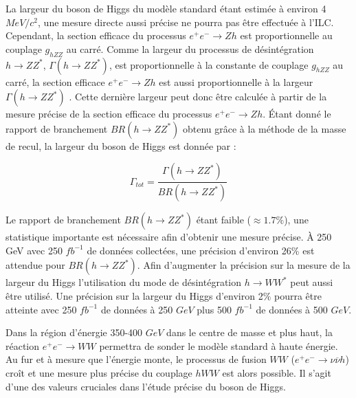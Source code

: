    \medskip
   
   La largeur du boson de Higgs du mod\`ele standard \'etant estim\'ee \`a environ 4 $MeV/c^2$, une mesure directe aussi pr\'ecise ne pourra pas \^etre effectu\'ee \`a l'ILC. Cependant, la section efficace du processus $e^+ e^- \rightarrow Zh$ est proportionnelle au couplage $g_{hZZ}$ au carr\'e. Comme la largeur du processus de d\'esint\'egration $h \rightarrow ZZ^*$, $\Gamma(h \rightarrow ZZ^*)$, est proportionnelle \`a la constante de couplage $g_{hZZ}$ au carr\'e, la section efficace $e^+ e^- \rightarrow Zh$ est aussi proportionnelle \`a la largeur $\Gamma(h \rightarrow ZZ^*)$ \cite{Durig:2014lfa}. Cette derni\`ere largeur peut donc \^etre calcul\'ee \`a partir de la mesure pr\'ecise de la section efficace du processus $e^+ e^- \rightarrow Zh$. Étant donn\'e le rapport de branchement $BR(h \rightarrow ZZ^*)$ obtenu gr\^ace \`a la m\'ethode de la masse de recul, la largeur du boson de Higgs est donn\'ee par : 
   
   \begin{equation}
    \Gamma_{tot} = \dfrac{\Gamma(h \rightarrow ZZ^*)}{BR(h \rightarrow ZZ^*)}
   \end{equation}
 
   Le rapport de branchement $BR(h \rightarrow ZZ^*)$ \'etant faible ($\approx 1.7 \%$), une statistique importante est n\'ecessaire afin d'obtenir une mesure pr\'ecise. \`A 250 GeV avec 250 $fb^{-1}$ de donn\'ees collect\'ees, une pr\'ecision d'environ 26\% est attendue pour $BR(h \rightarrow ZZ^*)$. Afin d'augmenter la pr\'ecision sur la mesure de la largeur du Higgs l'utilisation du mode de d\'esint\'egration $h \rightarrow WW^*$ peut aussi \^etre utilis\'e. Une pr\'ecision sur la largeur du Higgs d'environ 2$\%$ pourra \^etre atteinte avec 250 $fb^{-1}$ de donn\'ees \`a 250 $GeV$ plus 500 $fb^{-1}$ de donn\'ees \`a 500 $GeV$.

   \medskip
   
   Dans la région d'\'energie 350-400 $GeV$ dans le centre de masse et plus haut, la r\'eaction $e^+ e^- \rightarrow WW$ permettra de sonder le mod\`ele standard \`a haute \'energie. Au fur et \`a mesure que l'\'energie monte, le processus de fusion $WW$ ($e^+ e^- \rightarrow \nu \overline{\nu} h$) cro\^it et une mesure plus pr\'ecise du couplage $hWW$ est alors possible. Il s'agit d'une des valeurs cruciales dans l'\'etude pr\'ecise du boson de Higgs.
   
   \medskip
  
